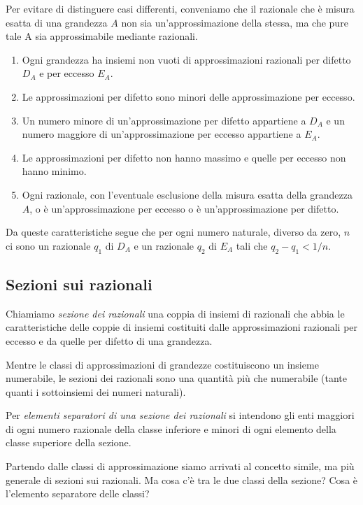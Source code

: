\begin{osservazione}
Per evitare di distinguere casi differenti, conveniamo che il razionale che 
è misura esatta di una grandezza \(A\) non sia un'approssimazione della 
stessa, ma che pure tale A sia approssimabile mediante razionali.
\begin{enumerate}
\item 
Ogni grandezza ha insiemi non vuoti di approssimazioni razionali per 
difetto \(D_A\) e per eccesso \(E_A\). 
\item 
Le approssimazioni per difetto sono minori delle approssimazione per eccesso.
\item 
Un numero minore di un'approssimazione per difetto appartiene a \(D_A\) e un 
numero maggiore di un'approssimazione per eccesso appartiene a \(E_A\).
\item 
Le approssimazioni per difetto non hanno massimo e quelle per eccesso non 
hanno minimo.
\item 
Ogni razionale, con l'eventuale esclusione della misura esatta della 
grandezza \(A\), o è un'approssimazione per eccesso o è un'approssimazione 
per difetto.
\end{enumerate}
Da queste caratteristiche segue che per ogni numero naturale, diverso da 
zero, \(n\) ci sono un razionale \(q_1\) di \(D_A\) e un razionale \(q_2\) di 
\(E_A\) tali che \(q_2-q_1 < 1/n\).
\end{osservazione}

\subsection{Sezioni sui razionali}

Chiamiamo \emph{sezione dei razionali} una coppia di insiemi 
di razionali che abbia le caratteristiche delle coppie di insiemi costituiti 
dalle approssimazioni razionali per eccesso e da quelle per difetto di una 
grandezza.

Mentre le classi di approssimazioni di grandezze costituiscono un insieme 
numerabile, le sezioni dei razionali sono una quantità più che numerabile 
(tante quanti i sottoinsiemi dei numeri naturali). 

Per \emph{elementi separatori di una sezione dei razionali} 
si intendono gli enti maggiori di ogni numero razionale della classe 
inferiore e minori di ogni elemento della classe superiore della sezione.

Partendo dalle classi di approssimazione siamo arrivati al concetto simile, 
ma più generale di sezioni sui razionali. Ma cosa c'è tra le due classi della 
sezione? Cosa è l'elemento separatore delle classi?

